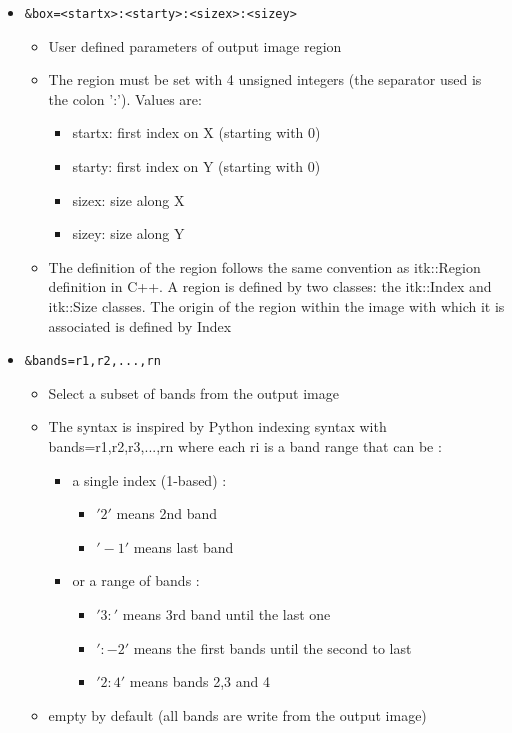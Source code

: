 \begin{itemize}
\item \begin{verbatim}&box=<startx>:<starty>:<sizex>:<sizey>\end{verbatim}
\begin{itemize}
    \item User defined parameters of output image region
    \item The region must be set with 4 unsigned integers (the separator used is
      the colon ':'). Values are:
      \begin{itemize}
        \item startx: first index on X (starting with 0)
        \item starty: first index on Y (starting with 0)
        \item sizex: size along X
        \item sizey: size along Y 
      \end{itemize}
    \item The definition of the region follows the same convention as itk::Region
    definition in C++. A region is defined by two classes: the itk::Index and
    itk::Size classes. The origin of the region within the image with which it
    is associated is defined by Index 
\end{itemize}
\item \begin{verbatim}&bands=r1,r2,...,rn\end{verbatim}
\begin{itemize}
    \item Select a subset of bands from the output image
    \item The syntax is inspired by Python indexing syntax with
      bands=r1,r2,r3,...,rn  where each ri is a band range that can be :
      \begin{itemize}
      \item a single index (1-based) :
        \begin{itemize}
          \item $'2'$ means 2nd band
          \item $'-1'$ means last band
          \end{itemize}
        \item or a range of bands :
          \begin{itemize}
            \item $'3:'$ means 3rd band until the last one
            \item $':-2'$ means the first bands until the second to last
            \item $'2:4'$ means bands 2,3 and 4
          \end{itemize}
      \end{itemize}
    \item empty by default (all bands are write from the output image)
\end{itemize}

\end{itemize}

